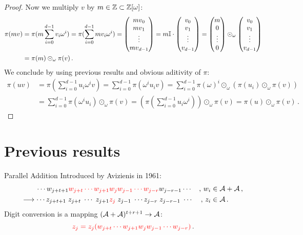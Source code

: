 \begin{proof}
Now we multiply $v$ by $m\in\mathbb{Z}\subset\mathbb{Z}[\omega]$:
\begin{align*}
\pi(m v)&=\pi(m \sum_{i=0}^{d-1} v_i \omega^i)=\pi(\sum_{i=0}^{d-1} m v_i \omega^i)=\begin{pmatrix} {mv}_0 \\ {mv}_1 \\ \vdots \\ {mv}_{d-1} \end{pmatrix}=m \mathbb{I} \cdot \begin{pmatrix} {v}_0 \\ {v}_1 \\ \vdots \\ {v}_{d-1} \end{pmatrix}=\begin{pmatrix}
              m\\
              0 \\
              \vdots \\
              0
              \end{pmatrix}\odot_\omega \begin{pmatrix} {v}_0 \\ {v}_1 \\ \vdots \\ {v}_{d-1} \end{pmatrix} \\
        &= \pi(m)\odot_\omega\pi(v)\,.
\end{align*}
We conclude by using previous results and obvious aditivity of $\pi$:
\begin{align*}
\pi(uv)&=\pi\left(\sum_{i=0}^{d-1} u_i \omega^i v\right)=\sum_{i=0}^{d-1}\pi(\omega^i u_i  v)=\sum_{i=0}^{d-1}\pi(\omega)^i \odot_\omega\left(\pi(u_i)\odot_\omega\pi(v)\right) \\
    &=\sum_{i=0}^{d-1}\pi(\omega^i u_i)\odot_\omega \pi(v)=\left(\pi(\sum_{i=0}^{d-1}u_i\omega^i)\right)\odot_\omega\pi(v)=\pi(u)\odot_\omega \pi(v)\,.
\end{align*}


\end{proof}


























 \section{Previous results}
 
    {Parallel Addition}
    Introduced by Avizienis in 1961:
  \begin{align*}
    \cdots w_{j+t+1}\textcolor{red}{w_{j+t} \cdots w_{j+1}}& \textcolor{red}{w_j w_{j-1} \cdots w_{j-r}}w_{j-r-1} \cdots &,\, w_i &\in \mathcal{A} + \mathcal{A}\,,    \\
    \longrightarrow \cdots z_{j+t+1}\;z_{j+t} \; \cdots \; z_{j+1} &\textcolor{red}{z_j} \; z_{j-1}\; \cdots z_{j-r}\;z_{j-r-1}\; \cdots &,\, z_i &\in \mathcal{A}\,.
  \end{align*}
  Digit conversion is a mapping $(\mathcal{A}+\mathcal{A})^{t+r+1} \to \mathcal{A}$:%
  $$
    \textcolor{red}{z_j=z_j(w_{j+t} \cdots w_{j+1}w_j w_{j-1} \cdots w_{j-r})}\,.
  $$
  
